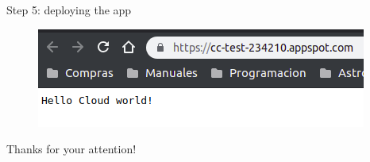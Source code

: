\documentclass{beamer}
\begin{document}
\begin{frame}[fragile]{Step 5: deploying the app}
    \begin{figure}[H]
      \centering
      \includegraphics[scale=0.75]{img/tutorial/9browse}
    \end{figure}
\end{frame}

\begin{frame}[fragile]
 \begin{center}
  \Huge
  Thanks for your attention!
 \end{center}
\end{frame}
\end{document}
